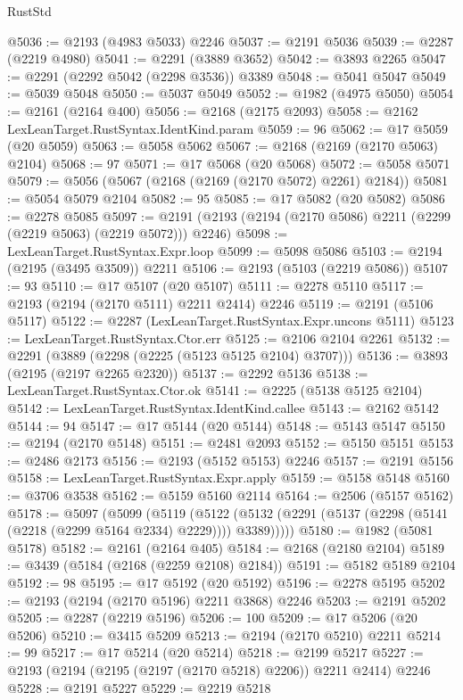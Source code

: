 \begin{lexlean}{RustStd}
\begin{coremodule}
{\begin{coremodule}
{{{{{{{{{{{{{{{{{{{{{{{{{{@5036 := @2193 (@4983 @5033) @2246
@5037 := @2191 @5036
@5039 := @2287 (@2219 @4980)
@5041 := @2291 (@3889 @3652)
@5042 := @3893 @2265
@5047 := @2291 (@2292 @5042 (@2298 @3536)) @3389
@5048 := @5041 @5047
@5049 := @5039 @5048
@5050 := @5037 @5049
@5052 := @1982 (@4975 @5050)
@5054 := @2161 (@2164 @400)
@5056 := @2168 (@2175 @2093)
@5058 := @2162 LexLeanTarget.RustSyntax.IdentKind.param
@5059 := 96
@5062 := @17 @5059 (@20 @5059)
@5063 := @5058 @5062
@5067 := @2168 (@2169 (@2170 @5063) @2104)
@5068 := 97
@5071 := @17 @5068 (@20 @5068)
@5072 := @5058 @5071
@5079 := @5056 (@5067 (@2168 (@2169 (@2170 @5072) @2261) @2184))
@5081 := @5054 @5079 @2104
@5082 := 95
@5085 := @17 @5082 (@20 @5082)
@5086 := @2278 @5085
@5097 := @2191 (@2193 (@2194 (@2170 @5086) @2211 (@2299 (@2219 @5063) (@2219 @5072))) @2246)
@5098 := LexLeanTarget.RustSyntax.Expr.loop
@5099 := @5098 @5086
@5103 := @2194 (@2195 (@3495 @3509)) @2211
@5106 := @2193 (@5103 (@2219 @5086))
@5107 := 93
@5110 := @17 @5107 (@20 @5107)
@5111 := @2278 @5110
@5117 := @2193 (@2194 (@2170 @5111) @2211 @2414) @2246
@5119 := @2191 (@5106 @5117)
@5122 := @2287 (LexLeanTarget.RustSyntax.Expr.uncons @5111)
@5123 := LexLeanTarget.RustSyntax.Ctor.err
@5125 := @2106 @2104 @2261
@5132 := @2291 (@3889 (@2298 (@2225 (@5123 @5125 @2104) @3707)))
@5136 := @3893 (@2195 (@2197 @2265 @2320))
@5137 := @2292 @5136
@5138 := LexLeanTarget.RustSyntax.Ctor.ok
@5141 := @2225 (@5138 @5125 @2104)
@5142 := LexLeanTarget.RustSyntax.IdentKind.callee
@5143 := @2162 @5142
@5144 := 94
@5147 := @17 @5144 (@20 @5144)
@5148 := @5143 @5147
@5150 := @2194 (@2170 @5148)
@5151 := @2481 @2093
@5152 := @5150 @5151
@5153 := @2486 @2173
@5156 := @2193 (@5152 @5153) @2246
@5157 := @2191 @5156
@5158 := LexLeanTarget.RustSyntax.Expr.apply
@5159 := @5158 @5148
@5160 := @3706 @3538
@5162 := @5159 @5160 @2114
@5164 := @2506 (@5157 @5162)
@5178 := @5097
    (@5099
      (@5119
        (@5122 (@5132 (@2291 (@5137 (@2298 (@5141 (@2218 (@2299 @5164 @2334) @2229)))) @3389)))))
@5180 := @1982 (@5081 @5178)
@5182 := @2161 (@2164 @405)
@5184 := @2168 (@2180 @2104)
@5189 := @3439 (@5184 (@2168 (@2259 @2108) @2184))
@5191 := @5182 @5189 @2104
@5192 := 98
@5195 := @17 @5192 (@20 @5192)
@5196 := @2278 @5195
@5202 := @2193 (@2194 (@2170 @5196) @2211 @3868) @2246
@5203 := @2191 @5202
@5205 := @2287 (@2219 @5196)
@5206 := 100
@5209 := @17 @5206 (@20 @5206)
@5210 := @3415 @5209
@5213 := @2194 (@2170 @5210) @2211
@5214 := 99
@5217 := @17 @5214 (@20 @5214)
@5218 := @2199 @5217
@5227 := @2193 (@2194 (@2195 (@2197 (@2170 @5218) @2206)) @2211 @2414) @2246
@5228 := @2191 @5227
@5229 := @2219 @5218
}}}}}}}}}}}}}}}}}}}}}}}}}}
\end{coremodule}}
\end{coremodule}
\end{lexlean}
